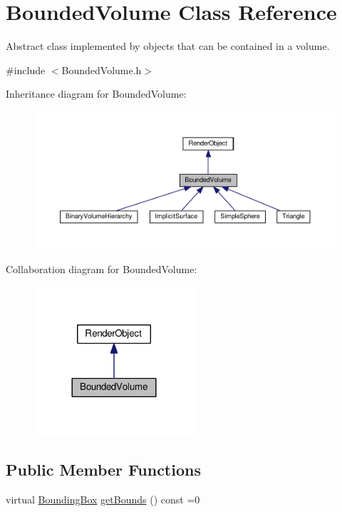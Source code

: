 \hypertarget{classBoundedVolume}{}\section{Bounded\+Volume Class Reference}
\label{classBoundedVolume}


Abstract class implemented by objects that can be contained in a volume.  




{\ttfamily \#include $<$Bounded\+Volume.\+h$>$}



Inheritance diagram for Bounded\+Volume\+:\nopagebreak
\begin{figure}[H]
\begin{center}
\leavevmode
\includegraphics[width=350pt]{classBoundedVolume__inherit__graph}
\end{center}
\end{figure}


Collaboration diagram for Bounded\+Volume\+:\nopagebreak
\begin{figure}[H]
\begin{center}
\leavevmode
\includegraphics[width=168pt]{classBoundedVolume__coll__graph}
\end{center}
\end{figure}
\subsection*{Public Member Functions}
\begin{DoxyCompactItemize}
\item 
virtual \hyperlink{classBoundingBox}{Bounding\+Box} \hyperlink{classBoundedVolume_a3d912b7028f7046fe18c4edf3a400e3b}{get\+Bounds} () const =0
\end{DoxyCompactItemize}


